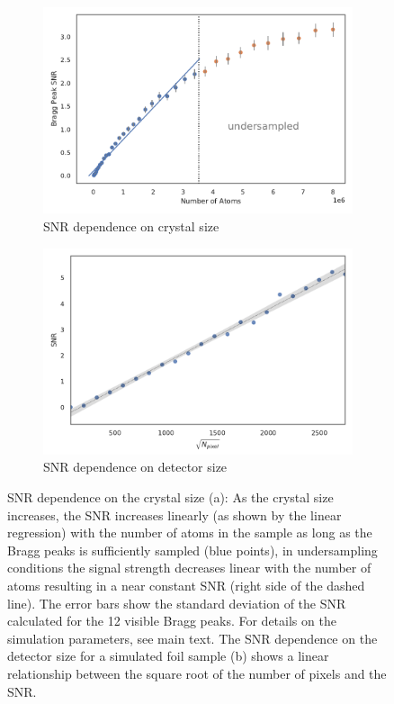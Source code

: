 \begin{figure}
	\centering
	\begin{subfigure}[b]{0.48\textwidth}
		\includegraphics[width=\linewidth]{images/SNRNatoms.pdf}
		\caption{ SNR dependence on crystal size}
		\label{fig:SNRNatoms}
	\end{subfigure}
	\begin{subfigure}[b]{0.48\textwidth}
		\includegraphics[width=\linewidth]{images/detsize.pdf}
		\caption{SNR dependence on detector size}
		\label{fig:SNRdetsize}
	\end{subfigure}
	\caption[SNR dependence on crystal size and detector size]{SNR dependence on the crystal size (a): As the crystal size increases, the SNR increases linearly (as shown by the linear regression) with the number of atoms in the sample as long as the Bragg peaks is sufficiently sampled (blue points), in undersampling conditions the signal strength decreases linear with the number of atoms resulting in a near constant SNR (right side of the dashed line). The error bars show the standard deviation of the SNR calculated for the 12 visible Bragg peaks. For details on the simulation parameters, see main text. The SNR dependence on the detector size for a simulated foil sample (b) shows a linear relationship between the square root of the number of pixels and the SNR.}
	
\end{figure}


